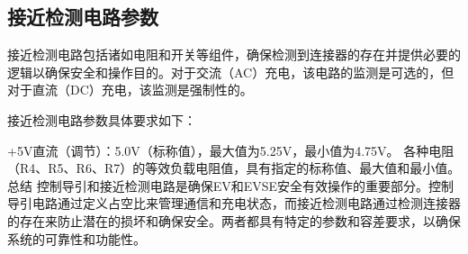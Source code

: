 \subsection{接近检测电路参数 }
接近检测电路包括诸如电阻和开关等组件，确保检测到连接器的存在并提供必要的逻辑以确保安全和操作目的。对于交流（AC）充电，该电路的监测是可选的，但对于直流（DC）充电，该监测是强制性的。

接近检测电路参数具体要求如下：

+5V直流（调节）：5.0V（标称值），最大值为5.25V，最小值为4.75V。
各种电阻（R4、R5、R6、R7）的等效负载电阻值，具有指定的标称值、最大值和最小值。
总结
控制导引和接近检测电路是确保EV和EVSE安全有效操作的重要部分。控制导引电路通过定义占空比来管理通信和充电状态，而接近检测电路通过检测连接器的存在来防止潜在的损坏和确保安全。两者都具有特定的参数和容差要求，以确保系统的可靠性和功能性。


